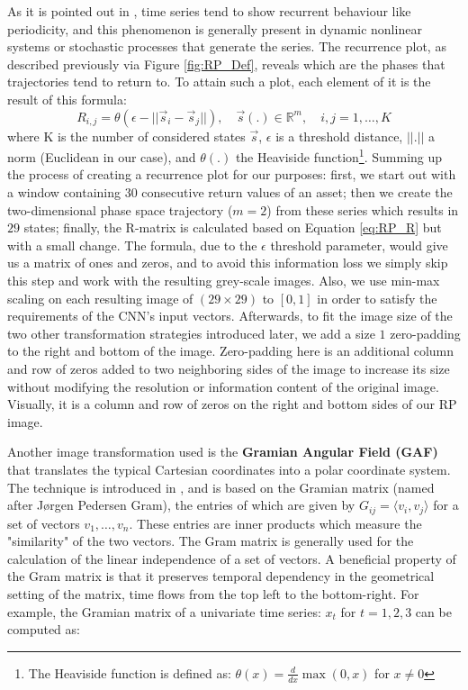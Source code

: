 \documentclass[12pt, a4paper]{article}
\begin{document}
As it is pointed out in \cite{hatami2018classification}, time series tend to show recurrent behaviour like periodicity, and this phenomenon is generally present in dynamic nonlinear systems or stochastic processes that generate the series. The recurrence plot, as described previously via Figure \ref{fig:RP_Def}, reveals which are the phases that trajectories tend to return to. To attain such a plot, each element of it is the result of this formula:
\begin{equation}
\label{eq:RP_R}
    R_{i,j} = \theta(\epsilon-||\vec{s}_i - \vec{s}_j||),\quad \vec{s}(.) \in \mathbb{R}^m, \quad i,j = 1,\dots,K
\end{equation}
where K is the number of considered states $\vec{s}$, $\epsilon$ is a threshold distance, $||.||$ a norm (Euclidean in our case), and $\theta(.)$ the Heaviside function\footnote{The Heaviside function is defined as: $\theta(x) = \frac{d}{dx}\max(0,x)$ for $x \neq 0$}. Summing up the process of creating a recurrence plot for our purposes: first, we start out with a window containing $30$ consecutive return values of an asset; then we create the two-dimensional phase space trajectory ($m=2$) from these series which results in $29$ states; finally, the R-matrix is calculated based on Equation \ref{eq:RP_R} but with a small change. 
The formula, due to the $\epsilon$ threshold parameter, would give us a matrix of ones and zeros, and to avoid this information loss we simply skip this step and work with the resulting grey-scale images. Also, we use min-max scaling on each resulting image of $(29 \times 29)$ to $[0, 1]$ in order to satisfy the requirements of the CNN's input vectors. 
Afterwards, to fit the image size of the two other transformation strategies introduced later, we add a size $1$ zero-padding to the right and bottom of the image. Zero-padding here is an additional column and row of zeros added to two neighboring sides of the image to increase its size without modifying the resolution or information content of the original image. Visually, it is a column and row of zeros on the right and bottom sides of our RP image.


Another image transformation used is the \textbf{Gramian Angular Field (GAF)} that translates the typical Cartesian coordinates into a polar coordinate system. The technique is introduced in \cite{wang2015encoding}, and is based on the Gramian matrix (named after J{\o}rgen Pedersen Gram), the entries of which are given by $G_{ij} = \langle v_i,v_j \rangle$ for a set of vectors $v_1,\dots, v_n$. These entries are inner products which measure the "similarity" of the two vectors. The Gram matrix is generally used for the calculation of the linear independence of a set of vectors. A beneficial property of the Gram matrix is that it preserves temporal dependency in the geometrical setting of the matrix, time flows from the top left to the bottom-right. For example, the Gramian matrix of a univariate time series: $x_t$ for $t=1, 2, 3$ can be computed as:
\end{document}
